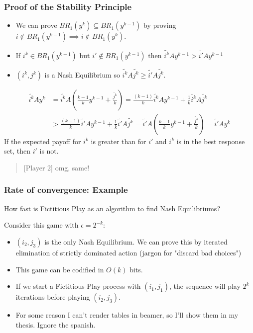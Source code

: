 \documentclass[pdf]{beamer}
\newcommand{\pstrat}{\widetilde}
\begin{document}
\begin{frame}
    \frametitle{Proof of the Stability Principle}
    \begin{itemize}
        \item We can prove $BR_1(y^{k}) \subseteq BR_1(y^{k-1})$ by proving $i \notin BR_1(y^{k-1}) \implies i \notin BR_1(y^{k})$.
        \item \pause If $i^k \in BR_1(y^{k-1})$ but $i' \notin BR_1(y^{k-1})$ then $\pstrat{i^k}Ay^{k-1} > \pstrat{i'}Ay^{k-1}$
        \item \pause $(i^k, j^k)$ is a Nash Equilibrium so $\pstrat{i^k}A\pstrat{j^k} \ge \pstrat{i'}A\pstrat{j^k}$.
    \end{itemize}
    \pause
    \begin{align*}
        \pstrat{i^k}Ay^k &= \pstrat{i^k}A(\frac{k - 1}{k} y^{k-1} + \frac{\pstrat{j^k}}{k}) = \frac{(k - 1)}{k} \pstrat{i^k}Ay^{k-1} + \frac{1}{k}\pstrat{i^k}A\pstrat{j^k}\\
        &> \frac{(k - 1)}{k} \pstrat{i'}Ay^{k-1} + \frac{1}{k}\pstrat{i'}A\pstrat{j^k} = \pstrat{i'}A(\frac{k - 1}{k} y^{k-1} + \frac{\pstrat{j^k}}{k}) = \pstrat{i'}Ay^k
    \end{align*}
    \pause If the expected payoff for $i^k$ is greater than for $i'$ and $i^k$ is in the best response set, then $i'$ is not.
    
    \begin{quote}[Player 2]
        omg, same!
    \end{quote}
\end{frame}

\begin{frame}
    \frametitle{Rate of convergence: Example}
    How fast is Fictitious Play as an algorithm to find Nash Equilibriums?

    \pause Consider this game with $\epsilon = 2^{-k}$:
    
    
    \begin{itemize}
        \item \pause $(i_2, j_3)$ is the only Nash Equilibrium. We can prove this by iterated elimination of strictly dominated action (jargon for "discard bad choices")
        \item \pause This game can be codified in $O(k)$ bits.
        \item \pause If we start a Fictitious Play process with $(i_1, j_1)$, the sequence will play $2^k$ iterations before playing $(i_2, j_3)$.
        \item \pause For some reason I can't render tables in beamer, so I'll show them in my thesis. Ignore the spanish.
    \end{itemize}
    
\end{frame}
\end{document}
